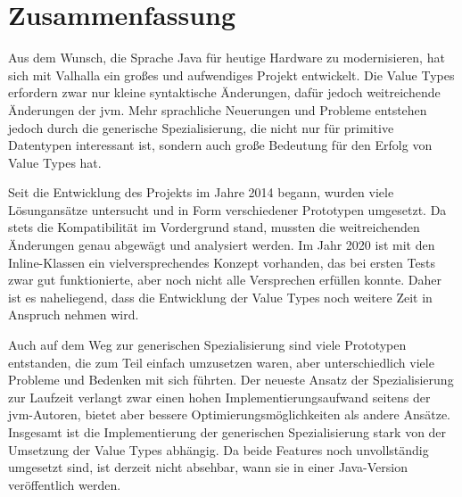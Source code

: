 \section{Zusammenfassung}\label{sec:summary}

Aus dem Wunsch, die Sprache Java für heutige Hardware zu modernisieren, hat sich mit Valhalla ein großes und aufwendiges Projekt entwickelt.
Die Value Types erfordern zwar nur kleine syntaktische Änderungen, dafür jedoch weitreichende Änderungen der \ac{jvm}.
Mehr sprachliche Neuerungen und Probleme entstehen jedoch durch die generische Spezialisierung, die nicht nur für primitive Datentypen interessant ist, sondern auch große Bedeutung für den Erfolg von Value Types hat.

Seit die Entwicklung des Projekts im Jahre 2014 begann, wurden viele Lösungansätze untersucht und in Form verschiedener Prototypen umgesetzt.
Da stets die Kompatibilität im Vordergrund stand, mussten die weitreichenden Änderungen genau abgewägt und analysiert werden.
Im Jahr 2020 ist mit den Inline-Klassen ein vielversprechendes Konzept vorhanden, das bei ersten Tests zwar gut funktionierte, aber noch nicht alle Versprechen erfüllen konnte.
Daher ist es naheliegend, dass die Entwicklung der Value Types noch weitere Zeit in Anspruch nehmen wird.

Auch auf dem Weg zur generischen Spezialisierung sind viele Prototypen entstanden, die zum Teil einfach umzusetzen waren, aber unterschiedlich viele Probleme und Bedenken mit sich führten.
Der neueste Ansatz der Spezialisierung zur Laufzeit verlangt zwar einen hohen Implementierungsaufwand seitens der \ac{jvm}-Autoren, bietet aber bessere Optimierungsmöglichkeiten als andere Ansätze.
Insgesamt ist die Implementierung der generischen Spezialisierung stark von der Umsetzung der Value Types abhängig.
Da beide Features noch unvollständig umgesetzt sind, ist derzeit nicht absehbar, wann sie in einer Java-Version veröffentlich werden.
